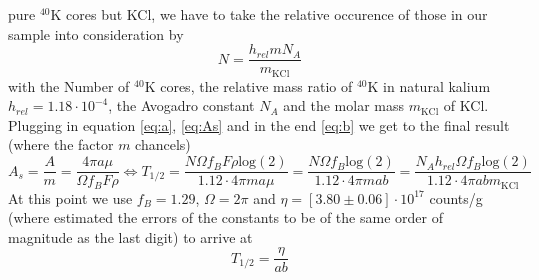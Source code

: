 pure $^{40}\textrm{K}$ cores but KCl, we have to take the relative occurence of those in our sample into consideration by
\begin{equation}
N = \frac{h_{rel} m N_A}{m_{\mathrm{KCl}}}
\end{equation}
with the Number of $^{40}\textrm{K}$ cores, the relative mass ratio of $^{40}\textrm{K}$ in natural kalium $h_{rel} = 1.18 \cdot 10^{-4}$,
the Avogadro constant $N_A$ and the molar mass $m_{\mathrm{KCl}}$ of KCl.
Plugging in equation \eqref{eq:a}, \eqref{eq:As} and in the end \eqref{eq:b} we get to the final result (where the factor $m$ chancels)
\begin{equation}
A_s = \frac{A}{m} =  \frac{4 \pi a \mu}{\Omega f_B F \rho} \Leftrightarrow T_{1/2} = \frac{N \Omega f_B F \rho \mathrm{log}(2)}{1.12 \cdot 4 \pi m a \mu} 
= \frac{N \Omega f_B \mathrm{log}(2)}{1.12 \cdot 4 \pi m a b} = \frac{N_A h_{rel}\Omega f_B \mathrm{log}(2)}{1.12 \cdot 4 \pi a b m_{\mathrm{KCl}}}
\end{equation}
At this point we use $f_B=1.29$, $\Omega = 2 \pi$ and $\eta = [3.80 \pm 0.06]\cdot 10^{17}$ counts/g (where estimated the errors of the constants to be of the 
same order of magnitude as the last digit) to arrive at
\begin{equation}
T_{1/2} = \frac{\eta}{a b} 
\label{eq:pot_final}
\end{equation}
